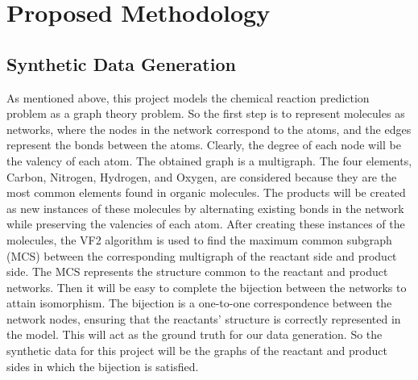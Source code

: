 \documentclass{article}
\begin{document}
\section{Proposed Methodology}

\subsection{Synthetic Data Generation}
As mentioned above, this project models the chemical reaction prediction problem as a graph theory problem. So the first step is to represent molecules as networks, where the nodes in the network correspond to the atoms, and the edges represent the bonds between the atoms. Clearly, the degree of each node will be the valency of each atom. The obtained graph is a multigraph. The four elements, Carbon, Nitrogen, Hydrogen, and Oxygen, are considered because they are the most common elements found in organic molecules. The products will be created as new instances of these molecules by alternating existing bonds in the network while preserving the valencies of each atom. After creating these instances of the molecules, the VF2 algorithm is used to find the maximum common subgraph (MCS) between the corresponding multigraph of the reactant side and product side. The MCS represents the structure common to the reactant and product networks. Then it will be easy to complete the bijection between the networks to attain isomorphism. The bijection is a one-to-one correspondence between the network nodes, ensuring that the reactants' structure is correctly represented in the model. This will act as the ground truth for our data generation. So the synthetic data for this project will be the graphs of the reactant and product sides in which the bijection is satisfied.
\end{document}

